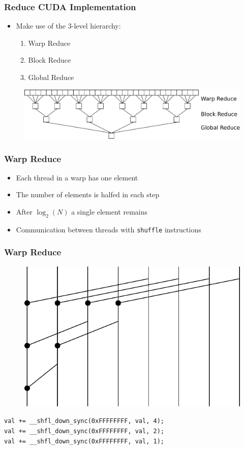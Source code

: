 \documentclass[aspectratio=169]{beamer}
\begin{document}
\frame
{	
	\frametitle{Reduce CUDA Implementation}
	\begin{itemize}
		\item Make use of the 3-level hierarchy:
		\begin{enumerate}
			\item Warp Reduce
			\item Block Reduce
			\item Global Reduce
		\end{enumerate}	
	\end{itemize}
\begin{figure}
	\centering
	\includegraphics[height=0.3\textheight]{reduce}
\end{figure}
}


\frame
{	
	\frametitle{Warp Reduce}
	\begin{itemize}
		\item Each thread in a warp has one element
		\item The number of elements is halfed in each step
		\item After $\log_2(N)$ a single element remains
		\item Communication between threads with \texttt{shuffle} instructions
	\end{itemize}
}


\begin{frame}[fragile]
\frametitle{Warp Reduce}
\begin{figure}
	\includegraphics[height=0.5\textheight]{warpreduce}
\end{figure}
\begin{lstlisting}
val += __shfl_down_sync(0xFFFFFFFF, val, 4);
val += __shfl_down_sync(0xFFFFFFFF, val, 2);
val += __shfl_down_sync(0xFFFFFFFF, val, 1);
\end{lstlisting}

\end{frame}
\end{document}
